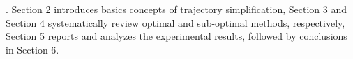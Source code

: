 . Section 2 introduces basics concepts of trajectory simplification,
Section 3 and Section 4 systematically review optimal and sub-optimal \lsa methods, respectively,
Section 5 reports and analyzes the experimental results, followed by
conclusions in Section 6.




